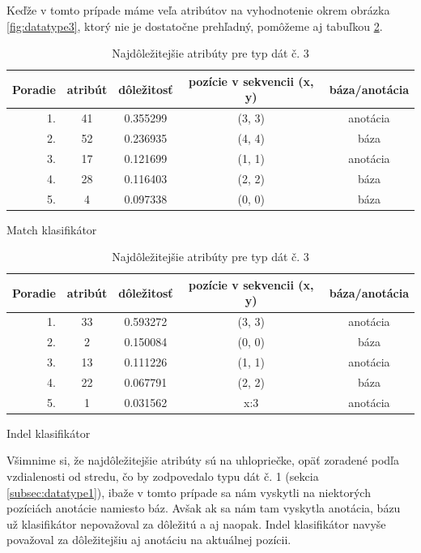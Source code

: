 Keďže v tomto prípade máme veľa atribútov na vyhodnotenie okrem obrázka \ref{fig:datatype3}, ktorý nie je dostatočne prehľadný, pomôžeme aj tabuľkou \ref{tab:datatype3}.
\begin{table}[htp]
\centering
\begin{subtable}{\textwidth}
\centering
\begin{tabular}{r|cccc}
Poradie & atribút & dôležitosť & pozície v sekvencii (x, y) & báza/anotácia\\
\hline
1. & 41 & 0.355299 & (3, 3) & anotácia\\
2. & 52 & 0.236935 & (4, 4) & báza\\
3. & 17 & 0.121699 & (1, 1) & anotácia\\
4. & 28 & 0.116403 & (2, 2) & báza\\
5. & 4 & 0.097338 & (0, 0) & báza\\
\end{tabular}
\caption{Match klasifikátor}
\end{subtable}

\begin{subtable}{\textwidth}
\centering
\begin{tabular}{r|cccc}
Poradie & atribút & dôležitosť & pozície v sekvencii (x, y) & báza/anotácia\\
\hline
1. & 33 & 0.593272 & (3, 3) & anotácia\\
2. & 2 & 0.150084 & (0, 0) & báza\\
3. & 13 & 0.111226 & (1, 1) & anotácia\\
4. & 22 & 0.067791 & (2, 2) & báza\\
5. & 1 & 0.031562 & x:3 & anotácia\\
\end{tabular}
\caption{Indel klasifikátor}
\end{subtable}
\caption[Najdôležitejšie atribúty pre typ dát č. 3]{Najdôležitejšie atribúty pre typ dát č. 3}
\label{tab:datatype3}
\end{table}
Všimnime si, že najdôležitejšie atribúty sú na uhlopriečke, opäť zoradené podľa vzdialenosti od stredu, čo by zodpovedalo typu dát č. 1 (sekcia \ref{subsec:datatype1}), ibaže v tomto prípade sa nám vyskytli na niektorých pozíciách anotácie namiesto báz.
Avšak ak sa nám tam vyskytla anotácia, bázu už klasifikátor nepovažoval za dôležitú a aj naopak.
Indel klasifikátor navyše považoval za dôležitejšiu aj anotáciu na aktuálnej pozícii.

